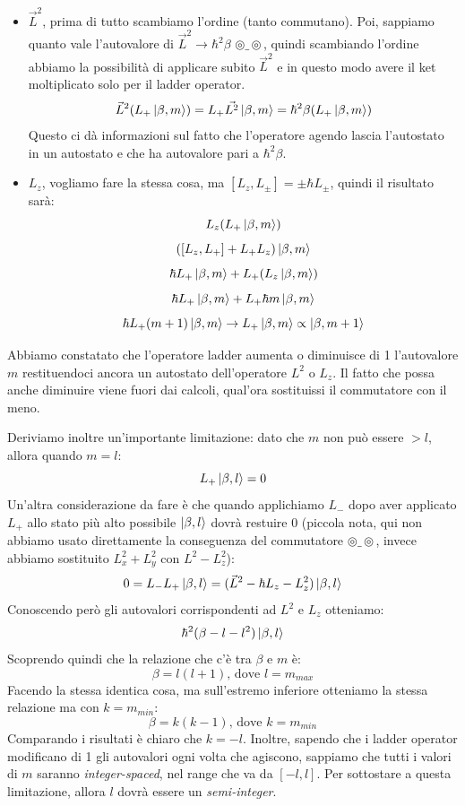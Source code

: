 \begin{itemize}
	\item $\vec{L}^2$, prima di tutto scambiamo l'ordine (tanto commutano). Poi, sappiamo quanto vale l'autovalore di $\vec{L}^2 \rightarrow \hbar^2\beta$ $\circledcirc \_ \circledcirc$, quindi scambiando l'ordine abbiamo la possibilità di applicare subito $\vec{L}^2$ e in questo modo avere il ket moltiplicato solo per il ladder operator.
	$$\vec{L}^2 (L_+\ket{\beta, m}) = L_+\vec{L^2} \ket{\beta, m} = \hbar^2 \beta (L_+\ket{\beta, m})$$
	Questo ci dà informazioni sul fatto che l'operatore agendo lascia l'autostato in un autostato e che ha autovalore pari a $\hbar ^ 2\beta$.
	\item $L_z$, vogliamo fare la stessa cosa, ma $[L_z, L_{\pm}] = \pm \hbar L_{\pm}$, quindi il risultato sarà:
	$$L_z(L_+\ket{\beta, m})$$
	$$([L_z, L_+] + L_+L_z)\ket{\beta, m}$$
	$$\hbar L_+\ket{\beta, m} + L_+(L_z\ket{\beta, m})$$
	$$\hbar L_+\ket{\beta, m} + L_+\hbar m \ket{\beta, m}$$
	$$\hbar L_+ (m+1) \ket{\beta, m} \rightarrow L_+\ket{\beta, m} \propto \ket{\beta, m + 1}$$
\end{itemize}

\noindent Abbiamo constatato che l'operatore ladder aumenta o diminuisce di 1 l'autovalore $m$ restituendoci ancora un autostato dell'operatore $L^2$ o $L_z$. Il fatto che possa anche diminuire viene fuori dai calcoli, qual'ora sostituissi il commutatore con il meno.

Deriviamo inoltre un'importante limitazione: dato che $m$ non può essere $> l$, allora quando $m = l$:
$$L_+\ket{\beta, l} = 0$$
Un'altra considerazione da fare è che quando applichiamo $L_-$ dopo aver applicato $L_+$ allo stato più alto possibile $\ket{\beta, l}$ dovrà restuire 0 (piccola nota, qui non abbiamo usato direttamente la conseguenza del commutatore $\circledcirc \_ \circledcirc$, invece abbiamo sostituito $L^2_x + L^2_y$ con $L^2 - L^2_z$):
$$0 = L_-L_+\ket{\beta, l} = (\vec{L}^2 -\hbar L_z -L^2_z)\ket{\beta, l}$$
Conoscendo però gli autovalori corrispondenti ad $L^2$ e $L_z$ otteniamo:
$$\hbar^2 (\beta - l - l^2) \ket{\beta, l}$$
Scoprendo quindi che la relazione che c'è tra $\beta$ e $m$ è:
$$\beta = l(l+1) \text{, dove } l = m_{max}$$
Facendo la stessa identica cosa, ma sull'estremo inferiore otteniamo la stessa relazione ma con $k = m_{min}$:
$$\beta = k(k-1)\text{, dove } k=m_{min}$$
Comparando i risultati è chiaro che  $k = -l$. Inoltre, sapendo che i ladder operator modificano di 1 gli autovalori ogni volta che agiscono, sappiamo che tutti i valori di $m$ saranno \textit{integer-spaced}, nel range che va da $[-l, l]$. Per sottostare a questa limitazione, allora $l$ dovrà essere un \textit{semi-integer}.

